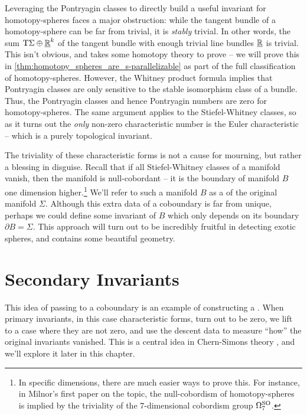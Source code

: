 Leveraging the Pontryagin classes to directly build a useful invariant for homotopy-spheres faces a major obstruction: while the tangent bundle of a homotopy-sphere can be far from trivial, it is \emph{stably} trivial. In other words, the sum $\mathrm{T} \Sigma\oplus \underline{\mathbb{R}}^k$ of the tangent bundle with enough trivial line bundles $\underline{\mathbb{R}}$ is trivial. This isn't obvious, and takes some homotopy theory to prove -- we will prove this in \cref{thm:homotopy_spheres_are_s-parallelizable} as part of the full classification of homotopy-spheres. However, the Whitney product formula implies that Pontryagin classes are only sensitive to the stable isomorphism class of a bundle. Thus, the Pontryagin classes and hence Pontryagin numbers are zero for homotopy-spheres. The same argument applies to the Stiefel-Whitney classes, so as it turns out the \emph{only} non-zero characteristic number is the Euler characteristic -- which is a purely topological invariant.

The triviality of these characteristic forms is not a cause for mourning, but rather a blessing in disguise. Recall that if all Stiefel-Whitney classes of a manifold vanish, then the manifold is null-cobordant -- it is the boundary of manifold $B$ one dimension higher.\footnote{In specific dimensions, there are much easier ways to prove this. For instance, in Milnor's first paper \cite{milnor1956manifolds} on the topic, the null-cobordism of homotopy-spheres is implied by the triviality of the $7$-dimensional cobordism group $\Omega^{\operatorname{SO}}_7$.} We'll refer to such a manifold $B$ as a  of the original manifold $\Sigma$. Although this extra data of a coboundary is far from unique, perhaps we could define some invariant of $B$ which only depends on its boundary $\partial B=\Sigma$. This approach will turn out to be incredibly fruitful in detecting exotic spheres, and contains some beautiful geometry.

\section{Secondary Invariants}

This idea of passing to a coboundary is an example of constructing a . When primary invariants, in this case characteristic forms, turn out to be zero, we lift to a case where they are not zero, and use the descent data to measure ``how'' the original invariants vanished. This is a central idea in Chern-Simons theory \cite{chernsimons1974geometricinvariants}, and we'll explore it later in this chapter.

